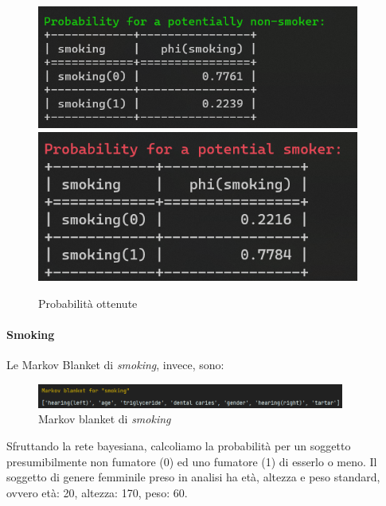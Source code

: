 \documentclass{article}
\begin{document}
\begin{figure}[H]
        \includegraphics[width=10.6cm]{imagePNS}
        \includegraphics[width=10.6cm]{imagePS}
        \centering
        \caption{Probabilità ottenute}
        \centering
\end{figure}


\paragraph{Smoking}

Le Markov Blanket di \textit{smoking}, invece, sono:

\begin{figure}[H]
        \includegraphics[width=0.9\textwidth]{MARK}
        \centering
        \caption{Markov blanket di \textit{smoking}}
        \centering
\end{figure}

%
Sfruttando la rete bayesiana, calcoliamo la probabilità per un soggetto presumibilmente non fumatore (0) ed uno fumatore (1) di esserlo o meno. Il soggetto di genere femminile preso in analisi ha età, altezza e peso standard, ovvero età: 20, altezza: 170, peso: 60.
\end{document}

